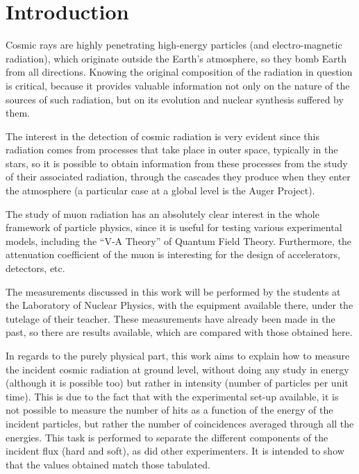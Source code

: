 	\chapter{Introduction}

	Cosmic rays are highly penetrating high-energy particles (and electro-magnetic radiation), which originate outside the Earth's atmosphere, so they bomb Earth from all directions. Knowing the original composition of the radiation in question is critical, because it provides valuable information not only on the nature of the sources of such radiation, but on its evolution and nuclear synthesis suffered by them.

The interest in the detection of cosmic radiation is very evident since this radiation comes from processes that take place in outer space, typically in the stars, so it is possible to obtain information from these processes from the study of their associated radiation, through the cascades they produce when they enter the atmosphere (a particular case at a global level is the Auger Project).

The study of muon radiation has an absolutely clear interest in the whole framework of particle physics, since it is useful for testing various experimental models, including the \enquote{V-A Theory} of Quantum Field Theory. Furthermore, the attenuation coefficient of the muon is interesting for the design of accelerators, detectors, etc.

The measurements discussed in this work will be performed by the students at the Laboratory of Nuclear Physics, with the equipment available there, under the tutelage of their teacher. These measurements have already been made ​​in the past, so there are results available, which are compared with those obtained here.

In regards to the purely physical part, this work aims to explain how to measure the incident cosmic radiation at ground level, without doing any study in energy (although it is possible too) but rather in intensity (number of particles per unit time). This is due to the fact that with the experimental set-up available, it is not possible to measure the number of hits as a function of the energy of the incident particles, but rather the number of coincidences averaged through all the energies. This task is performed to separate the different components of the incident flux (hard and soft), as did other experimenters. It is intended to show that the values ​​obtained match those tabulated.

